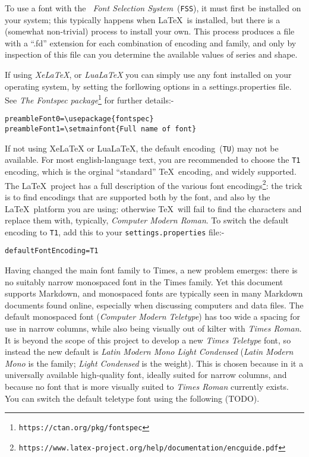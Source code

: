 \documentclass[a4paper,DIV=11]{scrartcl}
\begin{document}
To use a font with the \textit{\LaTeXe\ Font Selection
  System}~(\texttt{FSS}), it must first be installed on your system;
this typically happens when \LaTeX\ is installed, but there is a
(somewhat non-trivial) process to install your own. This process produces
a file with a ``.fd'' extension for each combination of encoding and
family, and only by inspection of this file can you determine the
available values of series and shape.

If using \textit{XeLaTeX}, or \textit{LuaLaTeX}
you can simply use any font installed on your operating system, by
setting the forllowing options in a settings.properties file. See \textit{The Fontspec
  package}\footnote{\texttt{https://ctan.org/pkg/fontspec}} for
further details:-

\nopagebreak
\begin{verbatim}
preambleFont0=\usepackage{fontspec}
preambleFont1=\setmainfont{Full name of font}
\end{verbatim}

If not using XeLaTeX or LuaLaTeX, the default encoding~(\verb!TU!) may
not be available. For most english-language text, you are recommended
to choose the \verb!T1! encoding, which is the orginal ``standard''
\TeX\ encoding, and widely supported. The \LaTeX\ project has a full
description of the various font
encodings\footnote{\texttt{https://www.latex-project.org/help/documentation/encguide.pdf}}:
the trick is to find encodings that are supported both by the font,
and also by the \LaTeX\ platform you are using: otherwise \TeX\ will
fail to find the characters and replace them with, typically,
\textit{Computer Modern Roman}. To switch the default encoding to
\verb!T1!, add this to your \verb!settings.properties! file:-

\nopagebreak
\begin{verbatim}
defaultFontEncoding=T1
\end{verbatim}

Having changed the main font family to Times, a new problem emerges:
there is no suitably narrow monospaced font in the Times family. Yet
this document supports Markdown, and monospaced fonts are typically
seen in many Markdown documents found online, especially when
discussing computers and data files. The default monospaced font
(\textit{Computer Modern Teletype}) has too wide a spacing for use in
narrow columns, while also being visually out of kilter with
\textit{Times Roman}. It is beyond the scope of this project to
develop a new \textit{Times Teletype} font, so instead the new default
is \textit{Latin Modern Mono Light Condensed} (\textit{Latin Modern
  Mono} is the family; \textit{Light Condensed} is the weight). This
is chosen because in it a universally available high-quality font,
ideally suited for narrow columns, and because no font that is more
visually suited to \textit{Times Roman} currently exists. You can
switch the default teletype font using the following (TODO).
\end{document}
